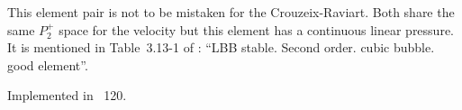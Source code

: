 
This element pair is not to be mistaken for the Crouzeix-Raviart. Both share the same $P_2^+$ space
for the velocity but this element has a continuous linear pressure.  
It is mentioned in Table~3.13-1 of \textcite{grsa}: ``LBB stable. Second order. cubic bubble. good element''.

Implemented in \stone~120.
